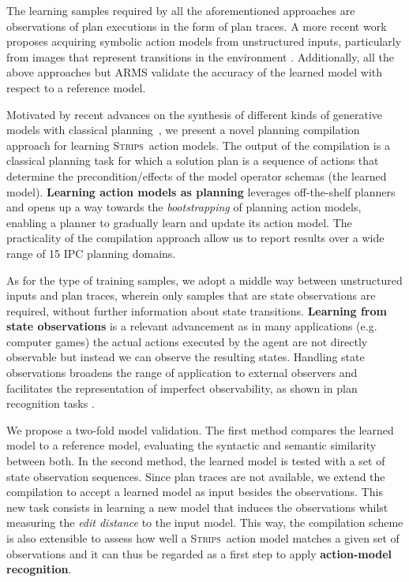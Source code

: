 \documentclass{article}
\newcommand{\strips}{\textsc{Strips}}     %
\begin{document}
The learning samples required by all the aforementioned approaches are observations of plan executions in the form of plan traces. A more recent work proposes acquiring symbolic action models from unstructured inputs, particularly from images that represent transitions in the environment \cite{AsaiF18}. Additionally, all the above approaches but {\sc ARMS} validate the accuracy of the learned model with respect to a reference model.

Motivated by recent advances on the synthesis of different kinds of generative models with classical planning~\cite{bonet2009automatic,segovia2016hierarchical,segovia2017generating}, we present a novel planning compilation approach for learning \strips\ action models. The output of the compilation is a classical planning task for which a solution plan is a sequence of actions that determine the precondition/effects of the model operator schemas (the learned model). \textbf{Learning action models as planning} leverages off-the-shelf planners and opens up a way towards the \emph{bootstrapping} of planning action models, enabling a planner to gradually learn and update its action model. The practicality of the compilation approach allow us to report results over a wide range of 15 IPC planning domains.

As for the type of training samples, we adopt a middle way between unstructured inputs and plan traces, wherein only samples that are state observations are required, without further information about state transitions. \textbf{Learning from state observations} is a relevant advancement as in many applications (e.g. computer games) the actual actions executed by the agent are not directly observable but instead we can observe the resulting states. Handling state observations broadens the range of application to external observers and facilitates the representation of imperfect observability, as shown in plan recognition tasks \cite{SohrabiRU16}.

We propose a two-fold model validation. The first method compares the learned model to a reference model, evaluating the syntactic and semantic similarity between both. In the second method, the learned model is tested with a set of state observation sequences. Since plan traces are not available, we extend the compilation to accept a learned model as input besides the observations. This new task consists in learning a new model that induces the observations whilst measuring the \emph{edit distance} to the input model. This way, the compilation scheme is also extensible to assess how well a \strips\ action model matches a given set of observations and it can thus be regarded as a first step to apply \textbf{action-model recognition}.
\end{document}
